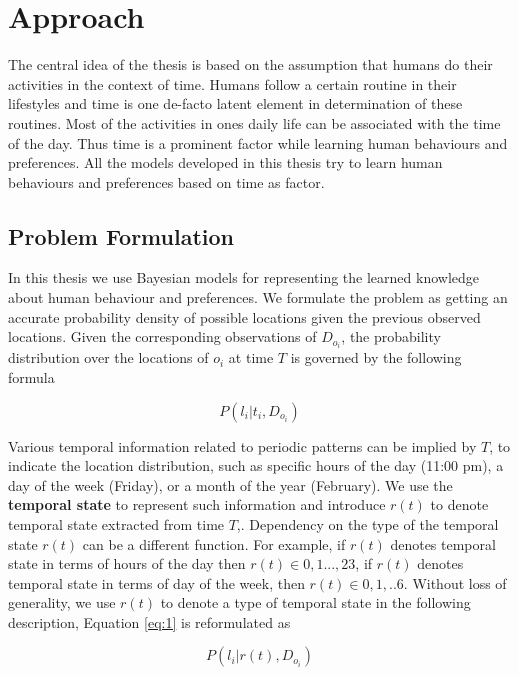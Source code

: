 \chapter{Approach}
\label{cha:approach}

The central idea of the thesis is based on the assumption that humans do their activities in the context of time. Humans follow a certain routine in their lifestyles and time is one de-facto latent element in determination of these routines. Most of the activities in ones daily life can be associated with the time of the day. Thus time is a prominent factor while learning human behaviours and preferences. All the models developed in this thesis try to learn human behaviours and preferences based on time as factor. 

\section{Problem Formulation}
In this thesis we use Bayesian models for representing the learned knowledge about human behaviour and preferences. We formulate the problem as getting an accurate probability density of possible locations given the previous observed locations. Given the corresponding observations of $D_{o_i}$, the probability distribution over the locations of $o_i$ at time $T$ is governed by the following formula 

    \begin{equation} \label{eq:1}
	    P(l_i | t_i, D_{o_i})
    \end{equation}

   Various temporal information related to periodic patterns can be implied by $T$, to indicate the location distribution, such as specific hours of the day (11:00 pm), a day of the week (Friday), or a month of the year (February). We use the \textbf{temporal state} to represent such information and introduce $r(t)$ to denote temporal state extracted from time $T$,.  Dependency on the type of the temporal state $r(t)$ can be a different function. For example, if $r(t)$ denotes temporal state in terms of hours of the day then $r(t) \in {0,1 ... , 23}$, if $r(t)$ denotes temporal state in terms of day of the week, then $r(t) \in {0,1, .. 6}$. Without loss of generality, we use $r(t)$ to denote a type of temporal state in the following description, Equation \ref{eq:1} is reformulated as 
    
    \begin{equation}
	    P( l_i | r(t), D_{o_i})
    \end{equation}
    
